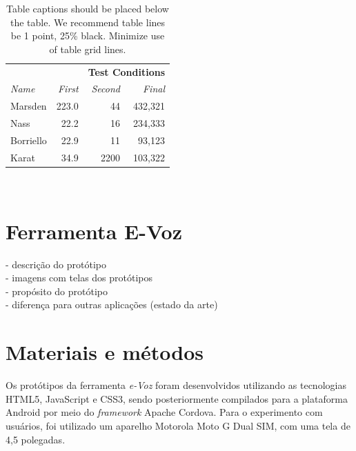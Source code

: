 \documentclass{sigchi}
\begin{document}
\begin{table}
  \centering
  \begin{tabular}{l r r r}
    & & \multicolumn{2}{c}{\small{\textbf{Test Conditions}}} \\
    \cmidrule(r){3-4}
    {\small\textit{Name}}
    & {\small \textit{First}}
      & {\small \textit{Second}}
    & {\small \textit{Final}} \\
    \midrule
    Marsden & 223.0 & 44 & 432,321 \\
    Nass & 22.2 & 16 & 234,333 \\
    Borriello & 22.9 & 11 & 93,123 \\
    Karat & 34.9 & 2200 & 103,322 \\
  \end{tabular}
  \caption{Table captions should be placed below the table. We
    recommend table lines be 1 point, 25\% black. Minimize use of
    table grid lines.}~\label{tab:table1}
\end{table}


\section{Ferramenta E-Voz}
- descrição do protótipo\\
- imagens com telas dos protótipos\\
- propósito do protótipo\\
- diferença para outras aplicações (estado da arte)\\




\section{Materiais e métodos}
Os protótipos da ferramenta \textit{e-Voz} foram desenvolvidos utilizando as tecnologias HTML5, JavaScript e CSS3, sendo posteriormente compilados para a plataforma Android por meio do \textit{framework} Apache Cordova. Para o experimento com usuários, foi utilizado um aparelho Motorola Moto G Dual SIM, com uma tela de 4,5 polegadas.
\end{document}
